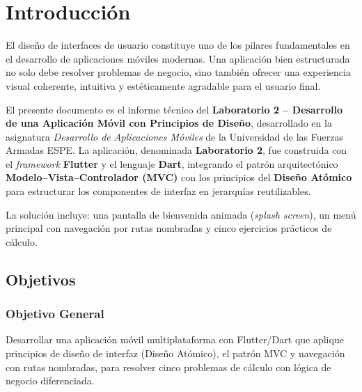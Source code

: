 \documentclass[12pt,a4paper]{article}
\begin{document}
\listoffigures

\listofalgorithms
{}


\newpage
{}
\setcounter{page}{1}

\section{Introducción}

El diseño de interfaces de usuario constituye uno de los pilares fundamentales en el desarrollo de aplicaciones móviles modernas. Una aplicación bien estructurada no solo debe resolver problemas de negocio, sino también ofrecer una experiencia visual coherente, intuitiva y estéticamente agradable para el usuario final.

El presente documento es el informe técnico del \textbf{Laboratorio 2 -- Desarrollo de una Aplicación Móvil con Principios de Diseño}, desarrollado en la asignatura \textit{Desarrollo de Aplicaciones Móviles} de la Universidad de las Fuerzas Armadas ESPE. La aplicación, denominada \textbf{Laboratorio 2}, fue construida con el \textit{framework} \textbf{Flutter} y el lenguaje \textbf{Dart}, integrando el patrón arquitectónico \textbf{Modelo--Vista--Controlador (MVC)} con los principios del \textbf{Diseño Atómico} para estructurar los componentes de interfaz en jerarquías reutilizables.

La solución incluye: una pantalla de bienvenida animada (\textit{splash screen}), un menú principal con navegación por rutas nombradas y cinco ejercicios prácticos de cálculo.

\subsection{Objetivos}

\subsubsection{Objetivo General}

Desarrollar una aplicación móvil multiplataforma con Flutter/Dart que aplique principios de diseño de interfaz (Diseño Atómico), el patrón MVC y navegación con rutas nombradas, para resolver cinco problemas de cálculo con lógica de negocio diferenciada.
\end{document}
